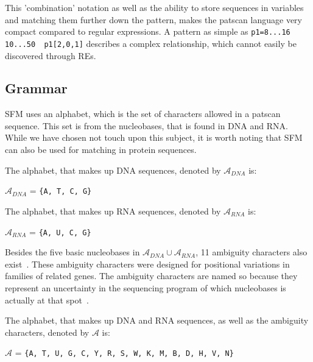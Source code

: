 \documentclass[12pt]{article}
\theoremstyle{definition}
\begin{document}
This 'combination' notation as well as the ability to store sequences in variables and matching them further down the pattern, makes the patscan language very compact compared to regular expressions. A pattern as simple as \texttt{p1=8...16 10...50 ~p1[2,0,1]} describes a complex relationship, which cannot easily be discovered through REs.

\subsection{Grammar}
\label{Patscan grammar}

SFM uses an alphabet, which is the set of characters allowed in a patscan sequence. This set is from the nucleobases, that is found in DNA and RNA. While we have chosen not touch upon this subject, it is worth noting that SFM can also be used for matching in protein sequences.
\begin{definition}
The alphabet, that makes up DNA sequences, denoted by $\mathcal{A}_{DNA}$ is:
\begin{center}
$\mathcal{A}_{DNA}$ = \texttt{\{A, T, C, G\}}
\end{center}
\end{definition}

\begin{definition}
The alphabet, that makes up RNA sequences, denoted by $\mathcal{A}_{RNA}$ is:
\begin{center}
$\mathcal{A}_{RNA}$ = \texttt{\{A, U, C, G\}}
\end{center}
\end{definition}

Besides the five basic nucleobases in $\mathcal{A}_{DNA} \cup \mathcal{A}_{RNA}$, 11 ambiguity characters also exist~\cite{DNA-sciencedaily}. These ambiguity characters were designed for positional variations in families of related genes. The ambiguity characters are named so because they represent an uncertainty in the sequencing program of which nucleobases is actually at that spot~\cite{ambiguitycodes, dna-base-error-rate}.

\begin{definition}
The alphabet, that makes up DNA and RNA sequences, as well as the ambiguity characters, denoted by $\mathcal{A}$ is:
\begin{center}
$\mathcal{A}$ = \texttt{\{A, T, U, G, C, Y, R, S, W, K, M, B, D, H, V, N\}}
\end{center}
\end{definition}
\end{document}
